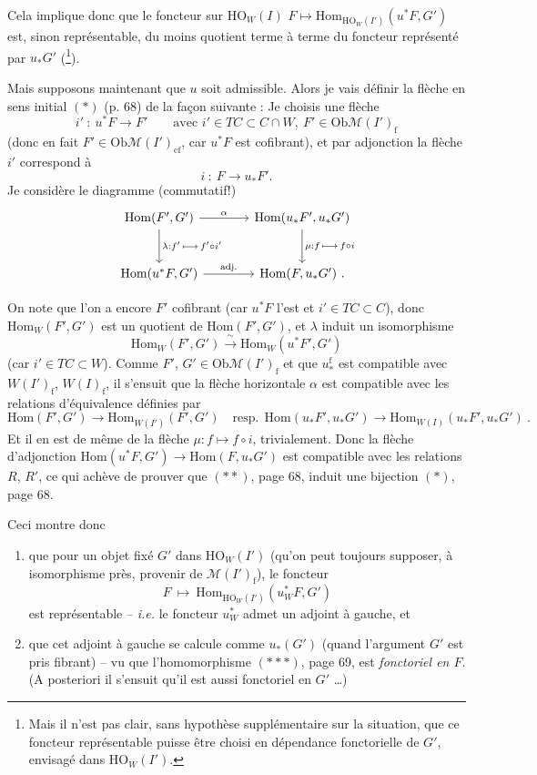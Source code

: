 \documentclass[11pt]{article}
\newcommand{\printedpage}[1]{\marginpar{\footnotesize p.~#1}}
\newcommand{\msp}[1]{\marginpar{\footnotesize [#1]}}
\newcommand{\HO}{\mathrm{HO}}
\newcommand{\Hom}{\mathrm{Hom}}
\newcommand{\Ob}{\mathrm{Ob}}
\newcommand{\rf}{\mathrm{f}}
\newcommand{\M}{\mathcal{M}}
\begin{document}
\printedpage{39}

Cela implique donc que le foncteur sur $\HO_W(I)$ $F \longmapsto \Hom_{\HO_{W}(I')}(u^*F,G')$ est, sinon représentable, du moins quotient terme à terme du foncteur représenté par $u_*G'$ (\footnote[37]{Mais il n'est pas clair, sans hypothèse supplémentaire sur la situation, que ce foncteur représentable puisse être choisi en dépendance fonctorielle de $G'$, envisagé dans $\HO_W(I')$.}).

\msp{page 70}

Mais supposons maintenant que $u$ soit admissible. Alors je vais définir la flèche en sens initial $(*)$ (p. 68) de la façon suivante : Je choisis une flèche
\[
i' \ : \ u^*F \longrightarrow F' \qquad \text{avec } i' \in TC \subset C \cap W,\ F' \in \Ob \M(I')_{\rf}
\]
(donc en fait $F' \in \Ob \M(I')_{\mathrm{cf}}$, car $u^*F$ est cofibrant), et par adjonction la flèche $i'$ correspond à
\[
i \ : \ F \longrightarrow u_*F'.
\]
Je considère le diagramme (commutatif!)
\[
\begin{tikzcd}[column sep=large, row sep=large]
\Hom(F',G') \arrow[r, "\alpha"] \arrow[d, "{\scriptstyle \lambda:f'\,\longmapsto\, f'\circ i'}"] & \Hom(u_*F',u_*G') \arrow[d, "{\scriptstyle \mu:f\,\longmapsto\, f\circ i}"] \\
\Hom(u^*F,G') \arrow[r, "\text{adj.}"] & \Hom(F,u_*G')\ .
\end{tikzcd}
\]

On note que l'on a encore $F'$ cofibrant (car $u^*F$ l'est et $i' \in TC \subset C$), donc $\Hom_W(F',G')$ est un quotient de $\Hom(F',G')$, et $\lambda$ induit un isomorphisme
\[
\Hom_W(F',G') \xrightarrow{\ \sim\ } \Hom_W(u^*F',G') %
\]
(car $i' \in TC \subset W$). Comme $F'$, $G' \in \Ob \M(I')_{\rf}$ et que $u_*^{\rf}$ est compatible avec $W(I')_{\rf}$, $W(I)_{\rf}$, il s'ensuit que la flèche horizontale $\alpha$
\msp{page 71}
est compatible avec les relations d'équivalence définies par
\[
\Hom(F',G') \longrightarrow \Hom_{W(I')}(F',G') \quad \text{resp.} \ \ \Hom(u_*F',u_*G') \longrightarrow \Hom_{W(I)}(u_*F',u_*G')\ .
\]
Et il en est de même de la flèche $\mu : f \longmapsto f \circ i$, trivialement. Donc la flèche d'adjonction $\Hom(u^*F,G') \longrightarrow \Hom(F,u_*G')$ est compatible avec les relations $R$, $R'$, ce qui achève de prouver que $(**)$, page 68, induit une bijection $(*)$, page 68.

Ceci montre donc

\begin{enumerate}
\item[1°)] que pour un objet fixé $G'$ dans $\HO_W(I')$ (qu'on peut toujours supposer, à isomorphisme près, provenir de $\M(I')_{\rf}$), le foncteur
\[
F \ \longmapsto\ \Hom_{\HO_{W}(I')}(u^*_W F,G')
\]
est représentable -- \textit{i.e.} le foncteur $u^*_W$ admet un adjoint à gauche, et
\item[2°)] que cet adjoint à gauche se calcule comme $u_*(G')$ (quand l'argument $G'$ est pris fibrant) -- vu que l'homomorphisme $({*}{*}{*})$, page 69, est \textit{fonctoriel en $F$}. (A posteriori il s'ensuit qu'il est aussi fonctoriel en $G'$ \dots)
\end{enumerate}
\end{document}

